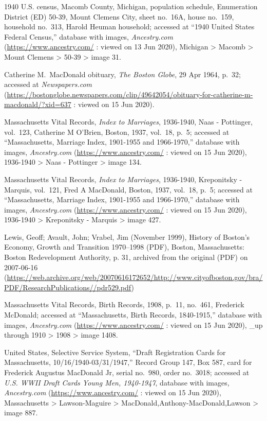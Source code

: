 \begin{thebibliography}{999}
	1940 U.S. census, Macomb County, Michigan, population schedule, Enumeration District (ED) 50-39, Mount Clemens City, sheet no.\ 16A, house no.\ 159, household no.\ 313, Harold Heuman household; accessed at ``1940 United States Federal Census,'' database with images, \textit{Ancestry.com} (\url{https://www.ancestry.com/} : viewed on 13 Jun 2020), Michigan > Macomb > Mount Clemens > 50-39 > image 31.
	
	Catherine M.\ MacDonald obituary, \textit{The Boston Globe}, 29 Apr 1964, p.\ 32; accessed at \textit{Newspapers.com} (\url{https://bostonglobe.newspapers.com/clip/49642054/obituary-for-catherine-m-macdonald/?xid=637} : viewed on 15 Jun 2020).
	
	Massachusetts Vital Records, \textit{Index to Marriages}, 1936-1940, Naas - Pottinger, vol.\ 123, Catherine M O'Brien, Boston, 1937, vol.\ 18, p.\ 5; accessed at ``Massachusetts, Marriage Index, 1901-1955 and 1966-1970,'' database with images, \textit{Ancestry.com} (\url{https://www.ancestry.com/} : viewed on 15 Jun 2020), 1936-1940 > Naas - Pottinger > image 134.
	
	Massachusetts Vital Records, \textit{Index to Marriages}, 1936-1940, Kreponitsky - Marquis, vol.\ 121, Fred A MacDonald, Boston, 1937, vol.\ 18, p.\ 5; accessed at ``Massachusetts, Marriage Index, 1901-1955 and 1966-1970,'' database with images, \textit{Ancestry.com} (\url{https://www.ancestry.com/} : viewed on 15 Jun 2020), 1936-1940 > Kreponitsky - Marquis > image 427.
	
	Lewis, Geoff; Avault, John; Vrabel, Jim (November 1999), History of Boston's Economy, Growth and Transition 1970–1998 (PDF), Boston, Massachusetts: Boston Redevelopment Authority, p. 31, archived from the original (PDF) on 2007-06-16 (\url{https://web.archive.org/web/20070616172652/http://www.cityofboston.gov/bra/PDF/ResearchPublications//pdr529.pdf})
	
	Massachusetts Vital Records, Birth Records, 1908, p.\ 11, no.\ 461, Frederick McDonald; accessed at ``Massachusetts, Birth Records, 1840-1915,'' database with images, \textit{Ancestry.com} (\url{https://www.ancestry.com/} : viewed on 15 Jun 2020), \_up through 1910 > 1908 > image 1408.
	
	United States, Selective Service System, ``Draft Registration Cards for Massachusetts, 10/16/1940-03/31/1947,'' Record Group 147, Box 587, card for Frederick Augustus MacDonald Jr, serial no.\ 980, order no.\ 3018; accessed at \textit{U.S. WWII Draft Cards Young Men, 1940-1947}, database with images, \textit{Ancestry.com} (\url{https://www.ancestry.com/} : viewed on 15 Jun 2020), Massachusetts > Lawson-Maguire > MacDonald,Anthony-MacDonald,Lawson > image 887.
	

\end{thebibliography}
